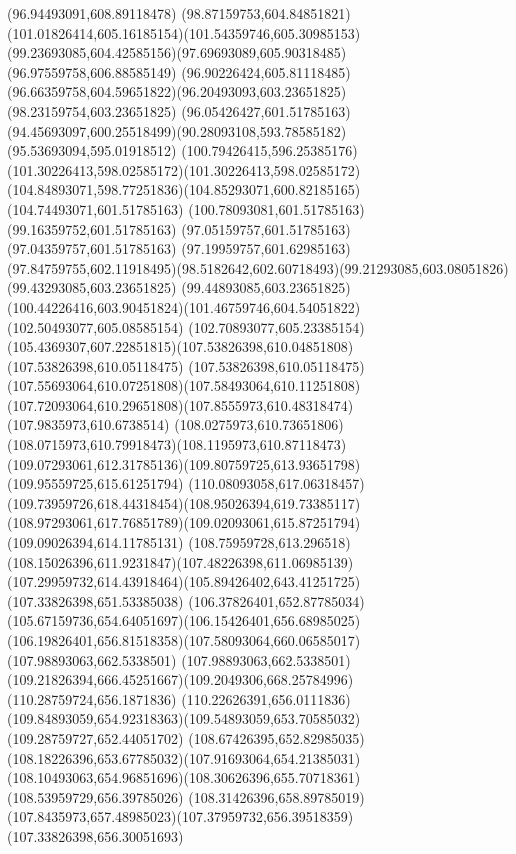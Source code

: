 {{\lineto(96.94493091,608.89118478)
\curveto(98.87159753,604.84851821)(101.01826414,605.16185154)(101.54359746,605.30985153)
\curveto(99.23693085,604.42585156)(97.69693089,605.90318485)(96.97559758,606.88585149)
\curveto(96.90226424,605.81118485)(96.66359758,604.59651822)(96.20493093,603.23651825)
\lineto(98.23159754,603.23651825)
\lineto(96.05426427,601.51785163)
\curveto(94.45693097,600.25518499)(90.28093108,593.78585182)(95.53693094,595.01918512)
\curveto(100.79426415,596.25385176)(101.30226413,598.02585172)(101.30226413,598.02585172)
\curveto(104.84893071,598.77251836)(104.85293071,600.82185165)(104.74493071,601.51785163)
\lineto(100.78093081,601.51785163)
\lineto(99.16359752,601.51785163)
\lineto(97.05159757,601.51785163)
\lineto(97.04359757,601.51785163)
\lineto(97.19959757,601.62985163)
\curveto(97.84759755,602.11918495)(98.5182642,602.60718493)(99.21293085,603.08051826)
\lineto(99.43293085,603.23651825)
\lineto(99.44893085,603.23651825)
\curveto(100.44226416,603.90451824)(101.46759746,604.54051822)(102.50493077,605.08585154)
\curveto(102.70893077,605.23385154)(105.4369307,607.22851815)(107.53826398,610.04851808)
\lineto(107.53826398,610.05118475)
\curveto(107.53826398,610.05118475)(107.55693064,610.07251808)(107.58493064,610.11251808)
\curveto(107.72093064,610.29651808)(107.8555973,610.48318474)(107.9835973,610.6738514)
\curveto(108.0275973,610.73651806)(108.0715973,610.79918473)(108.1195973,610.87118473)
\curveto(109.07293061,612.31785136)(109.80759725,613.93651798)(109.95559725,615.61251794)
\curveto(110.08093058,617.06318457)(109.73959726,618.44318454)(108.95026394,619.73385117)
\curveto(108.97293061,617.76851789)(109.02093061,615.87251794)(109.09026394,614.11785131)
\curveto(108.75959728,613.296518)(108.15026396,611.9231847)(107.48226398,611.06985139)
\curveto(107.29959732,614.43918464)(105.89426402,643.41251725)(107.33826398,651.53385038)
\curveto(106.37826401,652.87785034)(105.67159736,654.64051697)(106.15426401,656.68985025)
\curveto(106.19826401,656.81518358)(107.58093064,660.06585017)(107.98893063,662.5338501)
\curveto(107.98893063,662.5338501)(109.21826394,666.45251667)(109.2049306,668.25784996)
\lineto(110.28759724,656.1871836)
\lineto(110.22626391,656.0111836)
\curveto(109.84893059,654.92318363)(109.54893059,653.70585032)(109.28759727,652.44051702)
\curveto(108.67426395,652.82985035)(108.18226396,653.67785032)(107.91693064,654.21385031)
\curveto(108.10493063,654.96851696)(108.30626396,655.70718361)(108.53959729,656.39785026)
\lineto(108.31426396,658.89785019)
\curveto(107.8435973,657.48985023)(107.37959732,656.39518359)(107.33826398,656.30051693)
}}
